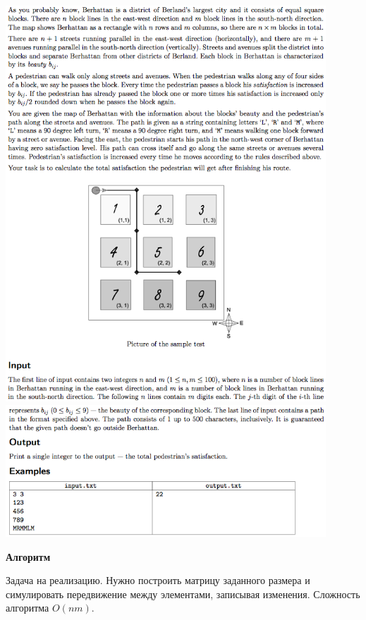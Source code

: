 \documentclass[a4paper,12pt]{article}
\begin{document}
\begin{center}
\includegraphics[width=0.9\textwidth]{CT_S02E05/CT_S02E05_A1.png}\\ [1cm]
\includegraphics[width=0.9\textwidth]{CT_S02E05/CT_S02E05_A2.png}\\ [1cm]
\end{center}

\textbf{{\large Алгоритм}}

Задача на реализацию. Нужно построить матрицу заданного размера и симулировать передвижение между элементами, записывая изменения. Сложность алгоритма $O(nm)$. \\
\end{document}
